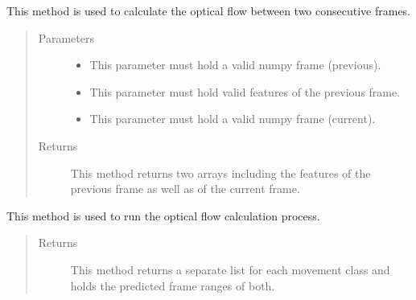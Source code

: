 \documentclass[letterpaper,10pt,english]{sphinxmanual}
\begin{document}
\begin{fulllineitems}
\begin{fulllineitems}
\end{fulllineitems}


\begin{fulllineitems}
\label{\detokenize{OpticalFlow:cmc.OpticalFlow.OpticalFlow.optical_flow}}
This method is used to calculate the optical flow between two consecutive frames.
\begin{quote}\begin{description}
\item[{Parameters}] \leavevmode\begin{itemize}
\item {} 
 \textendash{} This parameter must hold a valid numpy frame (previous).

\item {} 
 \textendash{} This parameter must hold valid features of the previous frame.

\item {} 
 \textendash{} This parameter must hold a valid numpy frame (current).

\end{itemize}

\item[{Returns}] \leavevmode
This method returns two arrays including the features of the previous frame as well as of the current frame.

\end{description}\end{quote}

\end{fulllineitems}


\begin{fulllineitems}
\label{\detokenize{OpticalFlow:cmc.OpticalFlow.OpticalFlow.run}}
This method is used to run the optical flow calculation process.
\begin{quote}\begin{description}
\item[{Returns}] \leavevmode
This method returns a separate list for each movement class and holds the predicted frame ranges of both.


\end{description}
\end{quote}
\end{fulllineitems}
\end{fulllineitems}
\end{document}
